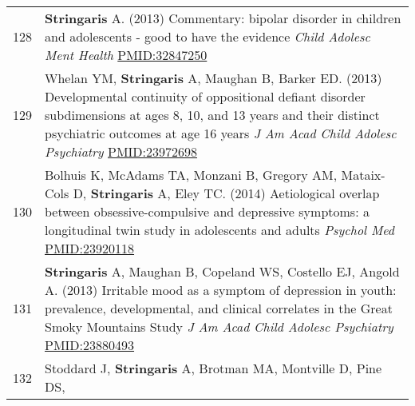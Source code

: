 \documentclass[
]{article}
\begin{document}
\begin{longtable}[]{@{}ll@{}}
\begin{minipage}[t]{0.01\columnwidth}\raggedright
128\strut
\end{minipage} & \begin{minipage}[t]{0.94\columnwidth}\raggedright
\textbf{Stringaris} A. (2013) Commentary: bipolar disorder in children
and adolescents - good to have the evidence \emph{Child Adolesc Ment
Health} \url{PMID:32847250}\strut
\end{minipage}\tabularnewline
\begin{minipage}[t]{0.01\columnwidth}\raggedright
129\strut
\end{minipage} & \begin{minipage}[t]{0.94\columnwidth}\raggedright
Whelan YM, \textbf{Stringaris} A, Maughan B, Barker ED. (2013)
Developmental continuity of oppositional defiant disorder subdimensions
at ages 8, 10, and 13 years and their distinct psychiatric outcomes at
age 16 years \emph{J Am Acad Child Adolesc Psychiatry}
\url{PMID:23972698}\strut
\end{minipage}\tabularnewline
\begin{minipage}[t]{0.01\columnwidth}\raggedright
130\strut
\end{minipage} & \begin{minipage}[t]{0.94\columnwidth}\raggedright
Bolhuis K, McAdams TA, Monzani B, Gregory AM, Mataix-Cols D,
\textbf{Stringaris} A, Eley TC. (2014) Aetiological overlap between
obsessive-compulsive and depressive symptoms: a longitudinal twin study
in adolescents and adults \emph{Psychol Med} \url{PMID:23920118}\strut
\end{minipage}\tabularnewline
\begin{minipage}[t]{0.01\columnwidth}\raggedright
131\strut
\end{minipage} & \begin{minipage}[t]{0.94\columnwidth}\raggedright
\textbf{Stringaris} A, Maughan B, Copeland WS, Costello EJ, Angold A.
(2013) Irritable mood as a symptom of depression in youth: prevalence,
developmental, and clinical correlates in the Great Smoky Mountains
Study \emph{J Am Acad Child Adolesc Psychiatry}
\url{PMID:23880493}\strut
\end{minipage}\tabularnewline
\begin{minipage}[t]{0.01\columnwidth}\raggedright
132\strut
\end{minipage} & \begin{minipage}[t]{0.94\columnwidth}\raggedright
Stoddard J, \textbf{Stringaris} A, Brotman MA, Montville D, Pine DS,

\end{minipage}
\end{longtable}
\end{document}
